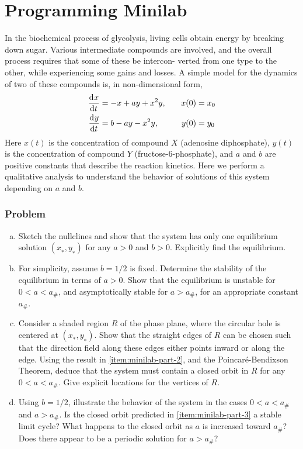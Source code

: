 \documentclass[12pt,twoside]{article}
\begin{document}
\section{Programming Minilab}
In the biochemical process of glycolysis, living cells obtain energy by breaking
down sugar. Various intermediate compounds are involved, and the overall process
requires that some of these be intercon- verted from one type to the other,
while experiencing some gains and losses. A simple model for the dynamics of two
of these compounds is, in non-dimensional form,
\begin{equation}
  \label{eq:minilab-problem}
  \begin{aligned}
    \frac{\mathrm{d}^{} {x}}{\mathrm{d}{t}^{}} &= -x+ay+x^2y,&\quad x(0)&=x_0 \\
    \frac{\mathrm{d}^{} {y}}{\mathrm{d}{t}^{}} &= b-ay-x^2y,&\quad y(0)&=y_0 \\
  \end{aligned}
\end{equation}
Here $x(t)$ is the concentration of compound $X$ (adenosine diphosphate), $y(t)$
is the concentration of compound $Y$ (fructose-6-phosphate), and $a$ and $b$ are
positive constants that describe the reaction kinetics. Here we perform a
qualitative analysis to understand the behavior of solutions of this system
depending on $a$ and $b$.
\subsubsection*{Problem}
\begin{enumerate}[(a)]
\item Sketch the nullclines and show that the system has only one equilibrium
  solution $(x_∗, y_∗)$ for any $a > 0$ and $b > 0$. Explicitly find the
  equilibrium.
\item \label{item:minilab-part-2} For simplicity, assume $b = 1/2$ is fixed.
  Determine the stability of the equilibrium in terms of $a > 0$. Show that the
  equilibrium is unstable for $0 < a < a_{\#}$, and asymptotically stable for $a >
  a_{\#}$, for an appropriate constant $a_{\#}$.
\item \label{item:minilab-part-3} Consider a shaded region $R$ of the phase
  plane, where the circular hole is centered at $(x_∗, y_∗)$. Show that the
  straight edges of $R$ can be chosen such that the direction field along these
  edges either points inward or along the edge. Using the result in
  \cref{item:minilab-part-2}, and the Poincar\'{e}-Bendixson Theorem, deduce that
  the system must contain a closed orbit in $R$ for any $0 < a < a_{\#}$. Give
  explicit locations for the vertices of $R$.
\item Using $b = 1/2$, illustrate the behavior of the system in the cases $0 < a
  < a_{\#}$ and $a > a_{\#}$. Is the closed orbit predicted in
  \cref{item:minilab-part-3} a stable limit cycle? What happens to the closed
  orbit as $a$ is increased toward $a_{\#}$? Does there appear to be a periodic
  solution for $a > a_{\#}$?
\end{enumerate}
\end{document}
